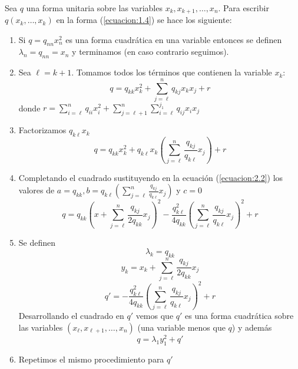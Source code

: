 \paragraph{}
Sea $q$ una forma unitaria sobre las variables $x_{k}, x_{k+1}, \ldots, x_{n}$. Para escribir $q\left(x_{k},\ldots,x_{k}\right)$ en la forma (\ref{ecuacion:1.4}) se hace los siguiente:
\begin{enumerate}
\item Si $q = q_{nn}x_{n}^{2}$ es una forma cuadrática en una variable entonces se definen $\lambda_{n} = q_{nn} = x_{n}$ y terminamos (en caso contrario seguimos).
\item Sea $\ell = k + 1$. Tomamos todos los términos que contienen la variable $x_{k}$:
\begin{equation*}
q = q_{kk}x_{k}^{2} + \sum_{j=\ell}^{n}q_{kj}x_{k}x_{j} + r
\end{equation*}
donde $r = \sum_{i=\ell}^{n}q_{ii}x_{i}^{2} + \sum_{j=\ell+1}^{n}\sum_{i=\ell}^{j_1} q_{ij}x_{i}x_{j}$
\item Factorizamos $q_{k\ell}x_{k}$
 \begin{equation*}
q = q_{kk}x_{k}^{2} + q_{k\ell}x_{k}\left(\sum_{j=\ell}^{n}\frac{q_{kj}}{q_{k\ell}}x_{j}\right) + r
\end{equation*}
\item Completando el cuadrado sustituyendo en la ecuación (\ref{ecuacion:2.2}) los valores de $a = q_{kk}, b= q_{k\ell}\left(\sum_{j=\ell}^{n}\frac{q_{kj}}{q_{k\ell}}x_{j}\right)$ y $c=0$
\begin{equation*}
q = q_{kk}\left(x + \sum_{j=\ell}^{n}\frac{q_{kj}}{2q_{kk}}x_{j}\right)^{2} - \frac{q_{k\ell}^{2}}{4q_{kk}}\left(\sum_{j=\ell}^{n}\frac{q_{kj}}{q_{k\ell}}x_{j}\right)^{2} + r
\end{equation*}
\item Se definen
\begin{equation*}
\lambda_{k} = q_{kk}
\end{equation*}
\begin{equation*}
y_{k} = x_{k} + \sum_{j=\ell}^{n}\frac{q_{kj}}{2q_{kk}}x_{j}
\end{equation*}
\begin{equation*}
q' = -\frac{q_{k\ell}^{2}}{4q_{kk}}\left(\sum_{j=\ell}^{n}\frac{q_{kj}}{q_{k\ell}}x_{j}\right)^{2} + r
\end{equation*}
Desarrollando el cuadrado en $q'$ vemos que $q'$ es una forma cuadrática sobre las variables $\left(x_{\ell},x_{\ell+1},\ldots,x_{n}\right)$ (una variable menos que $q$) y además 
\begin{equation*}
q = \lambda_{1}y_{1}^{2} + q'
\end{equation*}
\item Repetimos el mismo procedimiento para $q'$
\end{enumerate}
